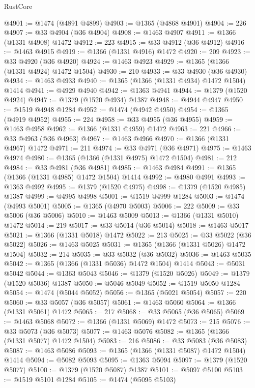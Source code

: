 \begin{lexlean}{RustCore}
\begin{coremodule}
@4901 := @1474 (@4891 @4899)
@4903 := @1365 (@4868 @4901)
@4904 := 226
@4907 := @33 @4904 (@36 @4904)
@4908 := @1463 @4907
@4911 := @1366 (@1331 @4908) @1472
@4912 := 223
@4915 := @33 @4912 (@36 @4912)
@4916 := @1463 @4915
@4919 := @1366 (@1331 @4916) @1472
@4920 := 209
@4923 := @33 @4920 (@36 @4920)
@4924 := @1463 @4923
@4929 := @1365 (@1366 (@1331 @4924) @1472 @1504)
@4930 := 210
@4933 := @33 @4930 (@36 @4930)
@4934 := @1463 @4933
@4940 := @1365 (@1366 (@1331 @4934) @1472 @1504) @1414
@4941 := @4929 @4940
@4942 := @1363 @4941
@4944 := @1379 (@1520 @4924)
@4947 := @1379 (@1520 @4934) @1387
@4948 := @4944 @4947
@4950 := @1519 @4948 @1284
@4952 := @1474 (@4942 @4950)
@4954 := @1365 (@4919 @4952)
@4955 := 224
@4958 := @33 @4955 (@36 @4955)
@4959 := @1463 @4958
@4962 := @1366 (@1331 @4959) @1472
@4963 := 221
@4966 := @33 @4963 (@36 @4963)
@4967 := @1463 @4966
@4970 := @1366 (@1331 @4967) @1472
@4971 := 211
@4974 := @33 @4971 (@36 @4971)
@4975 := @1463 @4974
@4980 := @1365 (@1366 (@1331 @4975) @1472 @1504)
@4981 := 212
@4984 := @33 @4981 (@36 @4981)
@4985 := @1463 @4984
@4991 := @1365 (@1366 (@1331 @4985) @1472 @1504) @1414
@4992 := @4980 @4991
@4993 := @1363 @4992
@4995 := @1379 (@1520 @4975)
@4998 := @1379 (@1520 @4985) @1387
@4999 := @4995 @4998
@5001 := @1519 @4999 @1284
@5003 := @1474 (@4993 @5001)
@5005 := @1365 (@4970 @5003)
@5006 := 222
@5009 := @33 @5006 (@36 @5006)
@5010 := @1463 @5009
@5013 := @1366 (@1331 @5010) @1472
@5014 := 219
@5017 := @33 @5014 (@36 @5014)
@5018 := @1463 @5017
@5021 := @1366 (@1331 @5018) @1472
@5022 := 213
@5025 := @33 @5022 (@36 @5022)
@5026 := @1463 @5025
@5031 := @1365 (@1366 (@1331 @5026) @1472 @1504)
@5032 := 214
@5035 := @33 @5032 (@36 @5032)
@5036 := @1463 @5035
@5042 := @1365 (@1366 (@1331 @5036) @1472 @1504) @1414
@5043 := @5031 @5042
@5044 := @1363 @5043
@5046 := @1379 (@1520 @5026)
@5049 := @1379 (@1520 @5036) @1387
@5050 := @5046 @5049
@5052 := @1519 @5050 @1284
@5054 := @1474 (@5044 @5052)
@5056 := @1365 (@5021 @5054)
@5057 := 220
@5060 := @33 @5057 (@36 @5057)
@5061 := @1463 @5060
@5064 := @1366 (@1331 @5061) @1472
@5065 := 217
@5068 := @33 @5065 (@36 @5065)
@5069 := @1463 @5068
@5072 := @1366 (@1331 @5069) @1472
@5073 := 215
@5076 := @33 @5073 (@36 @5073)
@5077 := @1463 @5076
@5082 := @1365 (@1366 (@1331 @5077) @1472 @1504)
@5083 := 216
@5086 := @33 @5083 (@36 @5083)
@5087 := @1463 @5086
@5093 := @1365 (@1366 (@1331 @5087) @1472 @1504) @1414
@5094 := @5082 @5093
@5095 := @1363 @5094
@5097 := @1379 (@1520 @5077)
@5100 := @1379 (@1520 @5087) @1387
@5101 := @5097 @5100
@5103 := @1519 @5101 @1284
@5105 := @1474 (@5095 @5103)

\end{coremodule}
\end{lexlean}
